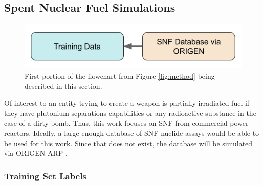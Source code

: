 \subsection{Spent Nuclear Fuel Simulations}
\label{sec:snfsim}

\begin{figure}[H]
  \centering
  \includegraphics[width=0.7\linewidth]{./chapters/method/methodology1.png}
  \caption{First portion of the flowchart from Figure \ref{fig:method} being 
           described in this section.}
\end{figure}

Of interest to an entity trying to create a weapon is partially irradiated fuel
if they have plutonium separations capabilities or any radioactive substance in
the case of a dirty bomb. Thus, this work focuses on \gls{SNF} from commercial
power reactors. Ideally, a large enough database of \gls{SNF} nuclide assays
would be able to be used for this work. Since that does not exist, the 
database will be simulated via \gls{ORIGEN-ARP} \cite{origen, origenarp}.  

\subsubsection{Training Set Labels}
\label{sec:snflbls}

